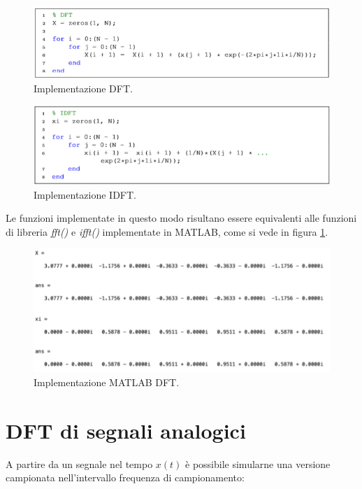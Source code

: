 \begin{minipage}[t]{.45\textwidth}
	\begin{figure}[H]
	\centering
	\includegraphics[width=\textwidth]{./images/cap3/DFT.png}
	\caption{Implementazione DFT.}
\end{figure}
\end{minipage}
\hfill
\begin{minipage}[t]{.45\textwidth}
	\begin{figure}[H]
	\centering
	\includegraphics[width=\textwidth]{./images/cap3/IDFT.png}
	\caption{Implementazione IDFT.}
\end{figure}	
\end{minipage}

Le funzioni implementate in questo modo risultano essere equivalenti alle 
funzioni di libreria \textit{fft()} e \textit{ifft()} implementate in MATLAB, 
come si vede in figura \ref{fig:output_L2E2}.

\begin{figure}[H]
\centering
\includegraphics[width=.75\textwidth]{./images/cap3/output_L2E2.png}
\caption{Implementazione MATLAB DFT.}
\label{fig:output_L2E2}
\end{figure}

\section{DFT di segnali analogici}
A partire da un segnale nel tempo $x(t)$ è possibile simularne una versione 
campionata nell’intervallo frequenza di campionamento:

